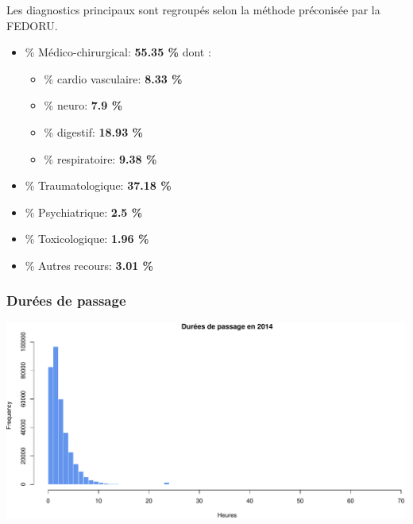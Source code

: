 \documentclass[]{article}
\begin{document}
Les diagnostics principaux sont regroupés selon la méthode préconisée
par la FEDORU.

\begin{itemize}
\item
  \% Médico-chirurgical: \textbf{55.35 \%} dont :

  \begin{itemize}
  \itemsep1pt\parskip0pt
  \item
    \% cardio vasculaire: \textbf{8.33 \%}
  \item
    \% neuro: \textbf{7.9 \%}
  \item
    \% digestif: \textbf{18.93 \%}
  \item
    \% respiratoire: \textbf{9.38 \%}
  \end{itemize}
\item
  \% Traumatologique: \textbf{37.18 \%}
\item
  \% Psychiatrique: \textbf{2.5 \%}
\item
  \% Toxicologique: \textbf{1.96 \%}
\item
  \% Autres recours: \textbf{3.01 \%}
\end{itemize}

\subsubsection{Durées de passage}\label{durees-de-passage}

\includegraphics{Figs/passages-1.pdf}
\end{document}
